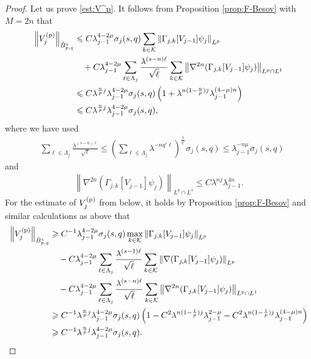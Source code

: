 \documentclass[a4paper,12pt,reqno]{amsart}
\theoremstyle{plain}
\theoremstyle{definition}
\newcommand{\dB}{\dot{B}}
\renewcommand{\leq}{\leqslant}
\renewcommand{\geq}{\geqslant}
\newcommand{\n}[1]{{\left\|#1\right\|}}
\renewcommand{\sp}[1]{\left(#1\right)}
\newcommand{\p}{{\rm p}}
\begin{document}
\begin{proof}
Let us prove \eqref{est:V^p}.
It follows from Proposition \ref{prop:F-Besov} with $M=2n$ that 
\begin{align}
    \n{V^{({\rm p})}_j}_{\dB_{p,q}^{s}}
    &
    \leq 
    C
    \lambda_{j-1}^{4-2\mu}
    \sigma_j(s,q)
    \sum_{k \in \mathcal{K}}
    \n{\Gamma_{j,k}[V_{j-1}]\psi_{j}}_{L^{p}}
    \\
    &\quad
    +
    C
    \lambda_{j-1}^{4-2\mu}
    \sum_{\ell\in \Lambda_j}
    \frac{\lambda^{(s-n)\ell}}{\sqrt{\ell}}
    \sum_{k \in \mathcal{K}}
    \n{\nabla^{2n}(\Gamma_{j,k}[V_{j-1}]\psi_{j})}_{L^{p} \cap L^1}
    \\
    &
    \leq 
    C\lambda^{\frac{n}{p}j}
    \lambda_{j-1}^{4-2\mu}
    \sigma_j(s,q)
    \sp{
    1+\lambda^{n(1-\frac{n}{p})j}\lambda_{j-1}^{(4-\mu)n}
    }
    \\
    &
    \leq 
    C
    \lambda^{\frac{n}{p}j}
    \lambda_{j-1}^{4-2\mu}
    \sigma_j(s,q),
\end{align}
where we have used 
\begin{align}
    &
    \sum_{\ell\in \Lambda_j}
    \frac{\lambda^{(s-n)\ell}}{\sqrt{\ell}}
    \leq 
    \sp{
    \sum_{\ell \in \Lambda_j}
    \lambda^{-nq'\ell}
    }^{\frac{1}{q'}}
    \sigma_j(s,q)
    \leq 
    \lambda_{j-1}^{-n\mu}
    \sigma_j(s,q)
\end{align}
and 
\begin{align}
    \n{\nabla^{2n}(\Gamma_{j,k}[V_{j-1}]\psi_{j})}_{L^{p} \cap L^1}
    \leq 
    C\lambda^{nj}\lambda_{j-1}^{4n}.
\end{align}
For the estimate of $V_j^{(\p)}$ from below, 
it holds by Proposition \ref{prop:F-Besov} and similar calculations as above that 
\begin{align}
    \n{V^{({\rm p})}_{j}}_{\dB_{p,q}^{s}}
    &
    \geq 
    C^{-1}
    \lambda_{j-1}^{4-2\mu}
    \sigma_j(s,q)
    \max_{k \in \mathcal{K}}
    \n{\Gamma_{j,k}[V_{j-1}]\psi_{j}}_{L^{p}}
    \\
    &\quad
    -
    C
    \lambda_{j-1}^{4-2\mu}
    \sum_{\ell\in \Lambda_j}
    \frac{\lambda^{(s-1)\ell}}{\sqrt{\ell}}
    \sum_{k \in \mathcal{K}}
    \n{\nabla(\Gamma_{j,k}[V_{j-1}]\psi_{j})}_{L^{p}}
    \\
    &\quad
    -
    C
    \lambda_{j-1}^{4-2\mu}
    \sum_{\ell\in \Lambda_j}
    \frac{\lambda^{(s-n)\ell}}{\sqrt{\ell}}
    \sum_{k \in \mathcal{K}}
    \n{\nabla^{2n}(\Gamma_{j,k}[V_{j-1}]\psi_{j})}_{L^{p} \cap L^1}
    \\
    &
    \geq 
    C^{-1}
    \lambda^{\frac{n}{p}j}
    \lambda_{j-1}^{4-2\mu}
    \sigma_j(s,q)
    \sp{
    1-C^2\lambda^{n(1-\frac{1}{p})j}\lambda_{j-1}^{2-\mu}-C^2\lambda^{n(1-\frac{1}{p})j}\lambda_{j-1}^{(4-\mu)n}
    }
    \\
    &
    \geq 
    C^{-1}
    \lambda^{\frac{n}{p}j}
    \lambda_{j-1}^{4-2\mu}
    \sigma_j(s,q).
\end{align}


\end{proof}
\end{document}
